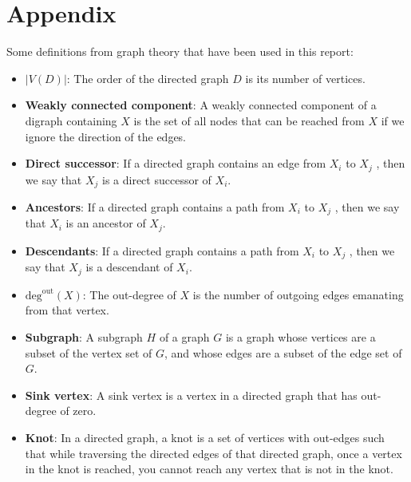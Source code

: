 \documentclass{article}
\begin{document}



\section*{Appendix}
Some definitions from graph theory that have been used in this report:

\begin{itemize}
  \item \textbf{$\left| V(D) \right|$}: The order of the directed graph $D$ is its number of vertices.
  \item \textbf{Weakly connected component}: A weakly connected component of a digraph containing $X$ is the set of all nodes that can be reached from $X$ if we ignore the direction of the edges.
  \item \textbf{Direct successor}: If a directed graph contains an edge from $X_i$ to $X_j$ , then we say that $X_j$ is a direct successor of $X_i$.
  \item \textbf{Ancestors}: If a directed graph contains a path from $X_i$ to $X_j$ , then we say that $X_i$ is an ancestor of $X_j$.
  \item \textbf{Descendants}: If a directed graph contains a path from $X_i$ to $X_j$ , then we say that $X_j$ is a descendant of $X_i$.
  \item \textbf{$\text{deg}^{\text{out}}(X)$}: The out-degree of $X$ is the number of outgoing edges emanating from that vertex.
  \item \textbf{Subgraph}: A subgraph $H$ of a graph $G$ is a graph whose vertices are a subset of the vertex set of $G$, and whose edges are a subset of the edge set of $G$.
  \item \textbf{Sink vertex}: A sink vertex is a vertex in a directed graph that has out-degree of zero.
  \item \textbf{Knot}: In a directed graph, a knot is a set of vertices with out-edges such that while traversing the directed edges of that directed graph, once a vertex in the knot is reached, you cannot reach any vertex that is not in the knot.
\end{itemize}
\end{document}
